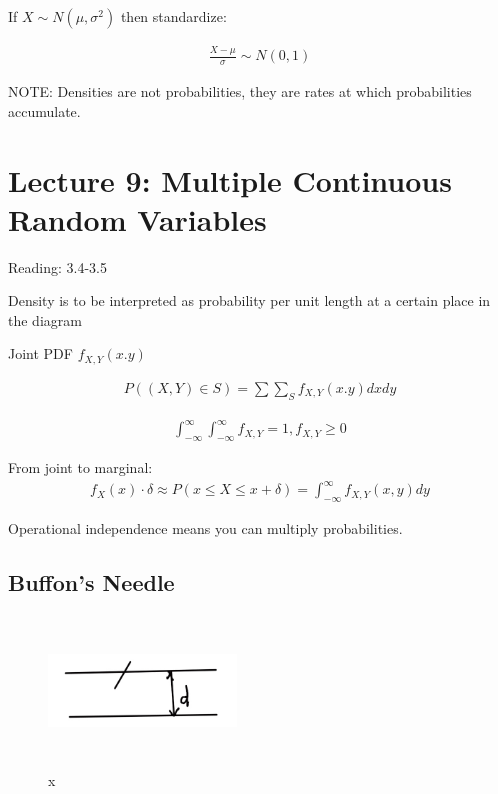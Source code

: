 \documentclass{article}
\begin{document}
If $X \sim N(\mu,\sigma^2)$ then standardize:

\begin{align*}
\frac{X- \mu}{\sigma} \sim N(0,1)
\end{align*}

NOTE: Densities are not probabilities, they are rates at which probabilities accumulate.

\section{Lecture 9: Multiple Continuous Random Variables}


Reading: 3.4-3.5

 Density is to be interpreted as probability per unit length at a certain place in the diagram


Joint PDF $f_{X,Y}(x.y)$

\begin{align*}
P((X,Y) \in S) = \sum \sum_S f_{X,Y}(x.y)dx dy
\end{align*}

\begin{align*}
\int_{-\infty}^{\infty} \int_{-\infty}^{\infty} f_{X,Y} = 1, f_{X,Y} \ge 0
\end{align*}

From joint to marginal:
\begin{align*}
f_X(x) \cdot \delta \approx P(x \le X \le x + \delta) = \int_{-\infty}^{\infty} f_{X,Y}(x,y)dy
\end{align*}

 Operational independence means you can multiply probabilities.

\subsection{Buffon's Needle}


\begin{figure}[h]
\centering
\includegraphics[width=5cm, height=4cm]{images/L09/buffon0.jpeg}
\caption{x}
\end{figure}
\end{document}
